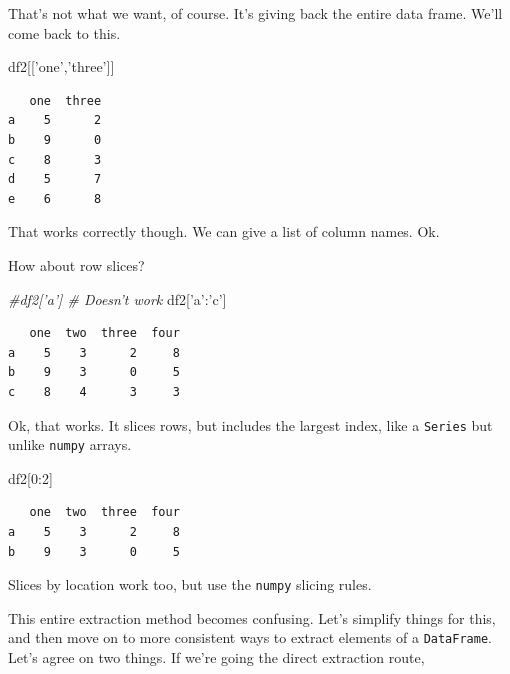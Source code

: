 \documentclass[
  letterpaper,
]{scrbook}
\newenvironment{Shaded}{\begin{snugshade}}{\end{snugshade}}
\newcommand{\CommentTok}[1]{\textcolor[rgb]{0.56,0.35,0.01}{\textit{#1}}}
\newcommand{\DecValTok}[1]{\textcolor[rgb]{0.00,0.00,0.81}{#1}}
\newcommand{\NormalTok}[1]{#1}
\newcommand{\StringTok}[1]{\textcolor[rgb]{0.31,0.60,0.02}{#1}}
\begin{document}
That's not what we want, of course. It's giving back the entire data frame. We'll come back to this.

\begin{Shaded}
\begin{Highlighting}[]
\NormalTok{df2[[}\StringTok{'one'}\NormalTok{,}\StringTok{'three'}\NormalTok{]]}
\end{Highlighting}
\end{Shaded}

\begin{verbatim}
   one  three
a    5      2
b    9      0
c    8      3
d    5      7
e    6      8
\end{verbatim}

That works correctly though. We can give a list of column names. Ok.

How about row slices?

\begin{Shaded}
\begin{Highlighting}[]
\CommentTok{#df2['a'] # Doesn't work}
\NormalTok{df2[}\StringTok{'a'}\NormalTok{:}\StringTok{'c'}\NormalTok{] }
\end{Highlighting}
\end{Shaded}

\begin{verbatim}
   one  two  three  four
a    5    3      2     8
b    9    3      0     5
c    8    4      3     3
\end{verbatim}

Ok, that works. It slices rows, but includes the largest index, like a \texttt{Series} but unlike \texttt{numpy} arrays.

\begin{Shaded}
\begin{Highlighting}[]
\NormalTok{df2[}\DecValTok{0}\NormalTok{:}\DecValTok{2}\NormalTok{]}
\end{Highlighting}
\end{Shaded}

\begin{verbatim}
   one  two  three  four
a    5    3      2     8
b    9    3      0     5
\end{verbatim}

Slices by location work too, but use the \texttt{numpy} slicing rules.

This entire extraction method becomes confusing. Let's simplify things for this, and then move on to more consistent ways to extract elements of a \texttt{DataFrame}. Let's agree on two things. If we're going the direct extraction route,
\end{document}
